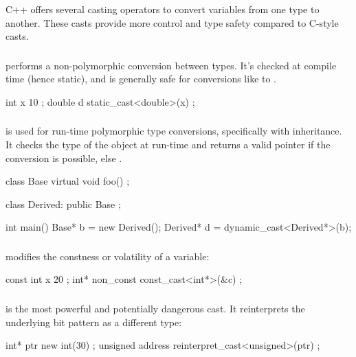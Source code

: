 \documentclass[12pt]{article}
\begin{document}
\noindent
C++ offers several casting operators to convert variables from one type to another.
These casts provide more control and type safety compared to C-style casts.

\subsubsection{}

\noindent
{} performs a non-polymorphic conversion between types.
It's checked at compile time (hence static), and is generally safe for conversions like  to .

\begin{cxx}{}
int x { 10 };
double d { static_cast<double>(x) };
\end{cxx}

\subsubsection{}

\noindent
{} is used for run-time polymorphic type conversions, specifically with inheritance.
It checks the type of the object at run-time and returns a valid pointer if the conversion is possible, else .

\begin{cxx}{}
class Base
{
	virtual void foo() {}
};

class Derived: public Base {};

int main()
{
	Base* b = new Derived();
	Derived* d = dynamic_cast<Derived*>(b);
}
\end{cxx}

\subsubsection{}

\noindent
{} modifies the constness or volatility of a variable:

\begin{cxx}{}
const int x { 20 };
int* non_const { const_cast<int*>(&c) };
\end{cxx}

\subsubsection{}

\noindent
{} is the most powerful and potentially dangerous cast.
It reinterprets the underlying bit pattern as a different type:

\begin{cxx}{}
int* ptr { new int(30) };
unsigned address { reinterpret_cast<unsigned>(ptr) };
\end{cxx}
\end{document}
